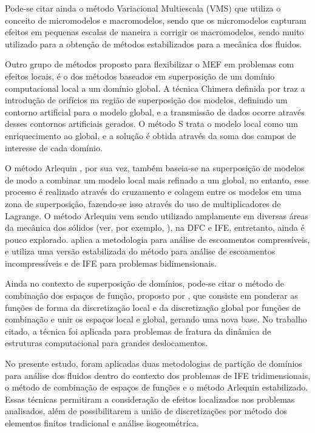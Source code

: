 Pode-se citar ainda o método Variacional Multiescala (VMS) \cite{Hughesetal:1998} que utiliza o conceito de micromodelos e macromodelos, sendo que os micromodelos capturam efeitos em pequenas escalas de maneira a corrigir os macromodelos, sendo muito utilizado para a obtenção de métodos estabilizados para a mecânica dos fluidos.

Outro grupo de métodos proposto para flexibilizar o MEF em problemas com efeitos locais, é o dos métodos baseados em superposição de um domínio computacional local a um domínio global. A técnica Chimera definida por  traz a introdução de orifícios na região de superposição dos modelos, definindo um contorno artificial para o modelo global, e a transmissão de dados ocorre através desses contornos artificiais gerados. O método S \cite{Fish:1992} trata o modelo local como um enriquecimento ao global, e a solução é obtida através da soma dos campos de interesse de cada domínio.

O método Arlequin \cite{Dhia:1998,DhiaR:2001}, por sua vez, também baseia-se na superposição de modelos de modo a combinar um modelo local mais refinado a um global, no entanto, esse processo é realizado através do cruzamento e colagem entre os modelos em uma zona de superposição, fazendo-se isso através do uso de multiplicadores de Lagrange.  O método Arlequin vem sendo utilizado amplamente em diversas áreas da mecânica dos sólidos (ver, por exemplo, ), na DFC e IFE, entretanto, ainda é pouco explorado.  aplica a metodologia para análise de escoamentos compressíveis, e  utiliza uma versão estabilizada do método para análise de escoamentos incompressíveis e de IFE para problemas bidimensionais.

Ainda no contexto de superposição de domínios, pode-se citar o método de combinação dos espaços de função, proposto por , que consiste em ponderar as funções de forma da discretização local e da discretização global por funções de combinação e unir os espaços local e global, gerando uma nova base. No trabalho citado, a técnica foi aplicada para problemas de fratura da dinâmica de estruturas computacional para grandes deslocamentos.

No presente estudo, foram aplicadas duas metodologias de partição de domínios para análise dos fluidos dentro do contexto dos problemas de IFE tridimensionais, o método de combinação de espaços de funções e o método Arlequin estabilizado. Essas técnicas permitiram a consideração de efeitos localizados nos problemas analisados, além de possibilitarem a união de discretizações por método dos elementos finitos tradicional e análise isogeométrica.

